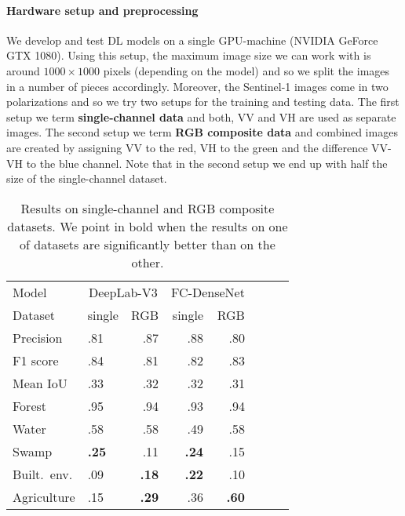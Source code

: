 \documentclass[a4paper]{article}
\begin{document}
\paragraph{Hardware setup and preprocessing}
We develop and test DL models on a single GPU-machine (NVIDIA GeForce GTX 1080). Using this setup, the maximum image size we can work with is around $1000 \times 1000$ pixels (depending on the model) and so we split the images in a number of pieces accordingly. Moreover, the Sentinel-1 images come in two polarizations and so we try two setups for the training and testing data. The first setup we term \textbf{single-channel data} and both, VV and VH are used as separate images. The second setup we term \textbf{RGB composite data} and combined images are created by assigning VV to the red, VH to the green and the difference VV-VH to the blue channel. Note that in the second setup we end up with half the size of the single-channel dataset.


\begin{wraptable}{l}{8.5cm}
\caption{Results on single-channel and RGB composite datasets. We point in bold when the results on one of datasets are significantly better than on the other.}

\begin{tabular}{ l l r r r r r r }
 \hline
	Model & \multicolumn{2}{c}{DeepLab-V3}  & \multicolumn{2}{c}{FC-DenseNet}   \\
    Dataset & single & RGB & single & RGB \\
  \hline			
  Precision & .81 & .87 & .88  & .80 \\
  F1 score & .84 & .81 & .82 & .83 \\
  Mean IoU & .33 & .32 & .32 & .31 \\
  Forest & .95 & .94 & .93 & .94 \\
  Water & .58 & .58 & .49 & .58 \\
  Swamp &  \textbf{.25} & .11 &  \textbf{.24} & .15 \\
  Built.\ env. & .09 &  \textbf{.18} & \textbf{.22} & .10  \\
  Agriculture & .15 &  \textbf{.29} & .36 & \textbf{.60}  \\
  \hline  
\end{tabular}

\label{tab:results_stats}
\end{wraptable}
\end{document}
